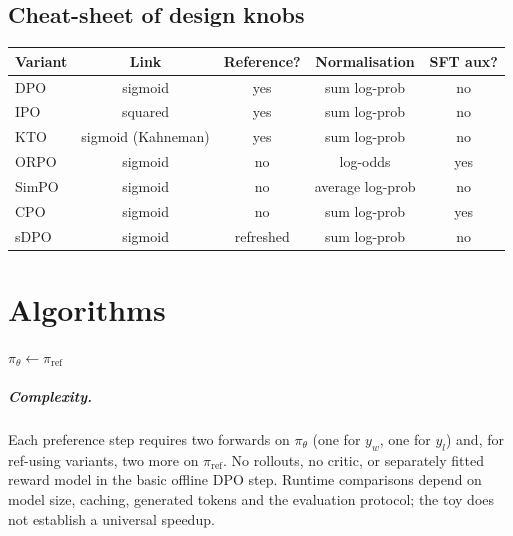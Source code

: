 \documentclass[11pt,oneside]{scrbook}
\begin{document}
\section{Cheat-sheet of design knobs}

\begin{center}
\small
\begin{tabular}{lcccc}
\toprule
\textbf{Variant} & \textbf{Link} & \textbf{Reference?} & \textbf{Normalisation} & \textbf{SFT aux?} \\
\midrule
DPO  & sigmoid  & yes & sum log-prob   & no \\
IPO  & squared  & yes & sum log-prob   & no \\
KTO  & sigmoid (Kahneman) & yes & sum log-prob & no \\
ORPO & sigmoid  & no  & log-odds       & yes \\
SimPO & sigmoid & no  & average log-prob & no \\
CPO  & sigmoid  & no  & sum log-prob   & yes \\
sDPO & sigmoid  & refreshed & sum log-prob & no \\
\bottomrule
\end{tabular}
\end{center}

\chapter{Algorithms}

\begin{algorithm}[H]
\SetAlgoLined
\DontPrintSemicolon
{}
$\pi_\theta \gets \pi_{\text{ref}}$ 
\caption{Generic DPO-family training loop.}
\label{alg:dpo}
\end{algorithm}

\paragraph{Complexity.} Each preference step requires two forwards
on $\pi_\theta$ (one for $y_w$, one for $y_l$) and, for
ref-using variants, two more on $\pi_{\text{ref}}$. No rollouts, no
critic, or separately fitted reward model in the basic offline DPO step. Runtime comparisons depend on model size, caching, generated tokens and the evaluation protocol; the toy does not establish a universal speedup.
\end{document}
